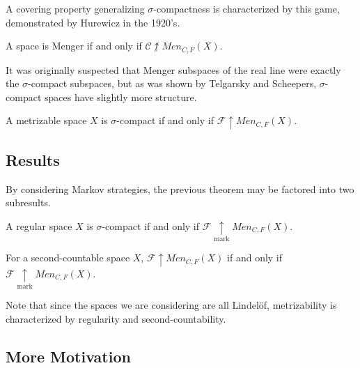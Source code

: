 \documentclass{beamer}
\theoremstyle{definition}
\newcommand{\win}{\uparrow}
\newcommand{\markwin}{\underset{\text{mark}}{\uparrow}}
\newcommand{\menGame}[1]{Men_{C,F}\left({#1}\right)}
\newcommand{\<}{\langle}
\renewcommand{\>}{\rangle}
\newcommand{\pl}[1]{\mathscr{#1}}
\begin{document}
\begin{frame}
  A covering property generalizing $\sigma$-compactness is characterized
  by this game, demonstrated by Hurewicz in the 1920's. \cite{MR1544773}

  \begin{theorem}
    A space is Menger if and only if $\pl C\not\win\menGame{X}$.
  \end{theorem}

  \pause

  It was originally suspected that Menger subspaces of the real line were
  exactly the $\sigma$-compact subspaces, but as was shown by Telgarsky
  and Scheepers, $\sigma$-compact spaces
  have slightly more structure. \cite{MR753073} \cite{MR1273523}

  \begin{theorem}
    A metrizable space $X$ is $\sigma$-compact if and only if
    $\pl F\win\menGame{X}$.
  \end{theorem}
\end{frame}

\subsection{Results}

\begin{frame}
  By considering Markov strategies, the previous theorem may be factored
  into two subresults.

  \begin{theorem}
    A regular space $X$ is $\sigma$-compact if and only if
    $\pl F\markwin\menGame{X}$.
  \end{theorem}
  \begin{theorem}
    For a second-countable space $X$, $\pl F\win\menGame{X}$ if and only if
    $\pl F\markwin\menGame{X}$.
  \end{theorem}

  Note that since the spaces we are considering are all Lindel\"of,
  metrizability is characterized by regularity and second-countability.
\end{frame}

\subsection{More Motivation}
\end{document}
